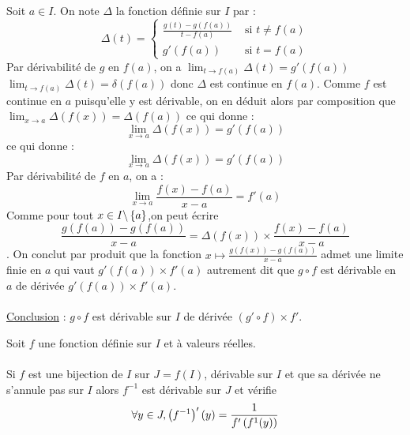 \begin{dem}
    Soit \(a \in I\). On note \(\Delta\) la fonction définie sur \(I\) par :
    \[\Delta(t) = \begin{cases}
        \frac{g(t) - g(f(a))}{t-f(a)} &\text{ si } t\neq f(a)\\
        g'(f(a)) &\text{ si } t=f(a) 
    \end{cases}\]
    Par dérivabilité de \(g\) en \(f (a)\), on a \(\lim _{t \to f(a)} \Delta(t) = g'(f(a))\) \cad \(\lim_{t\to f(a)} \Delta(t) = \delta(f(a))\) donc \(\Delta\) est continue en \(f(a)\). Comme \(f\) est continue en \(a\) puisqu'elle y est dérivable, on en déduit alors par composition que \(\lim_{x\to a} \Delta (f(x)) = \Delta (f(a))\) ce qui donne : 
    \[\lim_{x \to a} \Delta (f(x)) = g'(f(a))\] ce qui donne : 
    \[\lim_{x\to a } \Delta (f(x)) = g'(f(a))\]
    Par dérivabilité de \(f\) en \(a\), on a :
    \[\lim_{x \to a}\frac{f(x)-f(a)}{x-a} = f'(a)\]
    Comme pour tout \(x \in I \backslash \left\lbrace a\right\rbrace\),on peut écrire
    \[\frac{g(f(a))-g(f(a))}{x-a} = \Delta(f(x)) \times \frac{f(x)-f(a)}{x-a}\].
    On conclut par produit que la fonction \(x \mapsto \frac{g(f(x)) - g(f(a))}{x-a}\) admet une limite finie en \(a\) qui vaut \(g'(f(a)) \times f'(a)\) autrement dit que \(g \circ f\) est dérivable en \(a\) de dérivée \(g'(f(a)) \times f'(a)\).\\~\\
    \underline{Conclusion} : \(g \circ f\) est dérivable sur \(I\) de dérivée \((g' \circ f)\times f'\).
\end{dem}

\begin{defprop}
    Soit \(f\) une fonction définie sur \(I\) et à valeurs réelles.\\~\\
    Si \(f\) est une bijection de \(I\) sur \(J = f (I)\), dérivable sur \(I\) et que sa dérivée ne s’annule pas sur \(I\) alors \(f ^{-1}\) est dérivable sur \(J\) et vérifie
    \[\forall y \in J, \left(f ^{-1}\right)'(y) = \frac{1}{f ' \left(f ^{1}(y)\right)}\]
\end{defprop}

